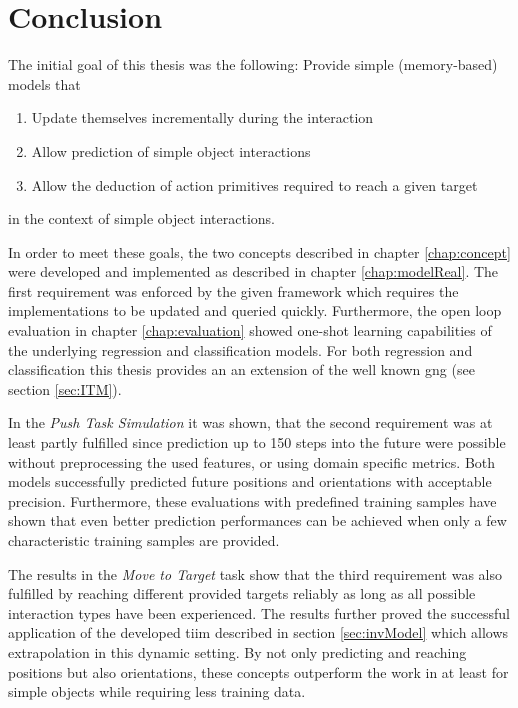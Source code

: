 \chapter{Conclusion \label{chap:conclusion}}


The initial goal of this thesis was the following:
Provide simple (memory-based) models that
\begin{enumerate}
\item Update themselves incrementally during the interaction
\item Allow prediction of simple object interactions
\item Allow the deduction of action primitives required to reach a given target
\end{enumerate}
in the context of simple object interactions.

In order to meet these goals, the two concepts described in chapter \ref{chap:concept} were developed and implemented as described in chapter \ref{chap:modelReal}. 
The first requirement was enforced by the given framework which requires the implementations to be updated and queried quickly. Furthermore, the open loop evaluation in chapter \ref{chap:evaluation} showed one-shot learning capabilities of the underlying regression and classification models. For both regression and classification this thesis provides an an extension of the well known \gls{gng} (see section \ref{sec:ITM}).

In the \textit{Push Task Simulation} it was shown, that the second requirement was at least partly fulfilled since prediction up to 150 steps into the future were possible without preprocessing the used features, or using domain specific metrics. Both models successfully predicted future positions and orientations with acceptable precision. Furthermore, these evaluations with predefined training samples have shown that even better prediction performances can be achieved when only a few characteristic training samples are provided.

The results in the \textit{Move to Target} task show that the third requirement was also fulfilled by reaching different provided targets reliably as long as all possible interaction types have been experienced. The results further proved the successful application of the developed \gls{tiim} described in section \ref{sec:invModel} which allows extrapolation in this dynamic setting.
By not only predicting and reaching positions but also orientations, these concepts outperform the work in \cite{pushing} at least for simple objects while requiring less training data. 


